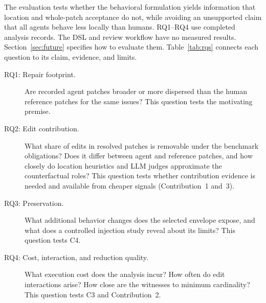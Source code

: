 \documentclass[a4paper,fleqn]{cas-sc}
\begin{document}
The evaluation tests whether the behavioral formulation yields information that location and whole-patch acceptance do not, while avoiding an unsupported claim that all agents behave less locally than humans. RQ1--RQ4 use completed analysis records. The DSL and review workflow have no measured results. Section~\ref{sec:future} specifies how to evaluate them. Table~\ref{tab:rqs} connects each question to its claim, evidence, and limits.

\begin{description}
\item[RQ1: Repair footprint.] Are recorded agent patches broader or more dispersed than the human reference patches for the same issues? This question tests the motivating premise.
\item[RQ2: Edit contribution.] What share of edits in resolved patches is removable under the benchmark obligations? Does it differ between agent and reference patches, and how closely do location heuristics and LLM judges approximate the counterfactual roles? This question tests whether contribution evidence is needed and available from cheaper signals (Contribution~1 and~3).
\item[RQ3: Preservation.] What additional behavior changes does the selected envelope expose, and what does a controlled injection study reveal about its limits? This question tests C4.
\item[RQ4: Cost, interaction, and reduction quality.] What execution cost does the analysis incur? How often do edit interactions arise? How close are the witnesses to minimum cardinality? This question tests C3 and Contribution~2.
\end{description}
\end{document}
